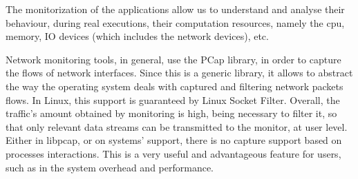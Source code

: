 \abstract 




The monitorization of the applications allow us to understand and analyse their behaviour, during real executions, their computation resources, namely the cpu, memory, IO devices (which includes the network devices), etc.

Network monitoring tools, in general, use the PCap library, in order to capture the flows of network interfaces.
Since this is a generic library, it allows to abstract the way the operating system deals with captured and filtering network packets flows.
In Linux, this support is guaranteed by Linux Socket Filter.
Overall, the traffic’s amount obtained by monitoring is high, being necessary to filter it, so that only relevant data streams can be transmitted to the monitor, at user level.
Either in libpcap, or on systems’ support, there is no capture support based on processes interactions.
This is a very useful and advantageous feature for users, such as in the system overhead and performance.
 
